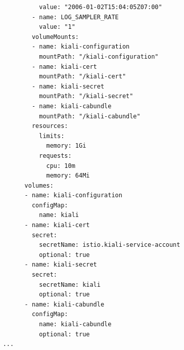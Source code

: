 \documentclass[12pt,a4paper]{report}
\begin{document}
{{\begin{lstlisting}
			  value: "2006-01-02T15:04:05Z07:00"
			- name: LOG_SAMPLER_RATE
			  value: "1"
			volumeMounts:
			- name: kiali-configuration
			  mountPath: "/kiali-configuration"
			- name: kiali-cert
			  mountPath: "/kiali-cert"
			- name: kiali-secret
			  mountPath: "/kiali-secret"
			- name: kiali-cabundle
			  mountPath: "/kiali-cabundle"
			resources:
			  limits:
				memory: 1Gi
			  requests:
				cpu: 10m
				memory: 64Mi
		  volumes:
		  - name: kiali-configuration
			configMap:
			  name: kiali
		  - name: kiali-cert
			secret:
			  secretName: istio.kiali-service-account
			  optional: true
		  - name: kiali-secret
			secret:
			  secretName: kiali
			  optional: true
		  - name: kiali-cabundle
			configMap:
			  name: kiali-cabundle
			  optional: true
	...
	
\end{lstlisting}

}}
\end{document}
